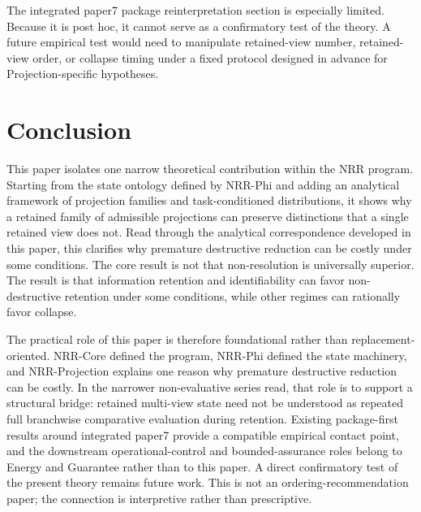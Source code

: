 \documentclass[11pt,a4paper]{article}
\begin{document}
The integrated paper7 package reinterpretation section is especially limited. Because it is post hoc, it cannot serve as a confirmatory test of the theory. A future empirical test would need to manipulate retained-view number, retained-view order, or collapse timing under a fixed protocol designed in advance for Projection-specific hypotheses.

\section{Conclusion}
\label{sec:conclusion}

This paper isolates one narrow theoretical contribution within the NRR program. Starting from the state ontology defined by NRR-Phi \cite{saito2026phi} and adding an analytical framework of projection families and task-conditioned distributions, it shows why a retained family of admissible projections can preserve distinctions that a single retained view does not. Read through the analytical correspondence developed in this paper, this clarifies why premature destructive reduction can be costly under some conditions. The core result is not that non-resolution is universally superior. The result is that information retention and identifiability can favor non-destructive retention under some conditions, while other regimes can rationally favor collapse.

The practical role of this paper is therefore foundational rather than replacement-oriented. NRR-Core \cite{saito2025nrr} defined the program, NRR-Phi \cite{saito2026phi} defined the state machinery, and NRR-Projection explains one reason why premature destructive reduction can be costly. In the narrower non-evaluative series read, that role is to support a structural bridge: retained multi-view state need not be understood as repeated full branchwise comparative evaluation during retention. Existing package-first results around integrated paper7 \cite{saito2026boundary} provide a compatible empirical contact point, and the downstream operational-control and bounded-assurance roles belong to Energy and Guarantee rather than to this paper. A direct confirmatory test of the present theory remains future work. This is not an ordering-recommendation paper; the connection is interpretive rather than prescriptive.
\end{document}

